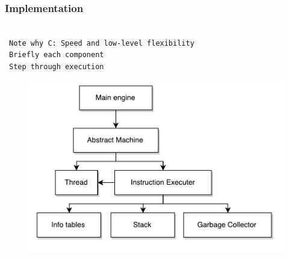 \documentclass{beamer}
\newcommand{\n}[1]{\leavevmode\\~\texttt{\color{red}\tiny #1}}
\begin{document}
\begin{frame}
  \frametitle{Implementation}

  \n{Note why C: Speed and low-level flexibility}
  \n{Briefly each component}
  \n{Step through execution}

  \begin{figure}[H]
    \centering
    \includegraphics[scale=0.5]{../figures/arch.pdf}
  \end{figure}
\end{frame}
\end{document}
